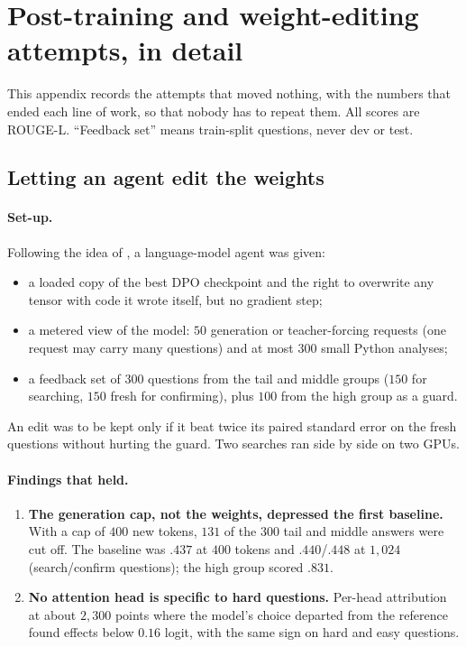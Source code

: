 \documentclass[11pt,a4paper]{article}
\newcommand{\rl}{ROUGE-L}
\begin{document}
\section{Post-training and weight-editing attempts, in detail}\label{app:failed}
This appendix records the attempts that moved nothing, with the numbers that ended each line of work, so that nobody has to repeat them. All scores are \rl{}. ``Feedback set'' means train-split questions, never dev or test.

\subsection{Letting an agent edit the weights}
\paragraph{Set-up.} Following the idea of \cite{wsp}, a language-model agent was given:
\begin{itemize}[leftmargin=*]
\item a loaded copy of the best DPO checkpoint and the right to overwrite any tensor with code it wrote itself, but no gradient step;
\item a metered view of the model: $50$ generation or teacher-forcing requests (one request may carry many questions) and at most $300$ small Python analyses;
\item a feedback set of $300$ questions from the tail and middle groups ($150$ for searching, $150$ fresh for confirming), plus $100$ from the high group as a guard.
\end{itemize}
An edit was to be kept only if it beat twice its paired standard error on the fresh questions without hurting the guard. Two searches ran side by side on two GPUs.

\paragraph{Findings that held.}
\begin{enumerate}[leftmargin=*,label=(\roman*)]
\item \textbf{The generation cap, not the weights, depressed the first baseline.} With a cap of $400$ new tokens, $131$ of the $300$ tail and middle answers were cut off. The baseline was $.437$ at $400$ tokens and $.440$/$.448$ at $1{,}024$ (search/confirm questions); the high group scored $.831$.
\item \textbf{No attention head is specific to hard questions.} Per-head attribution at about $2{,}300$ points where the model's choice departed from the reference found effects below $0.16$ logit, with the same sign on hard and easy questions.
\end{enumerate}
\end{document}
